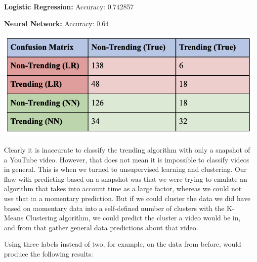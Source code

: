 \documentclass{article}
\begin{document}
\textbf{Logistic Regression:} Accuracy: 0.742857 
\par \textbf{Neural Network:} Accuracy: 0.64 
\begin{center}
\includegraphics[scale=.7]{momentary_at.png}\\
\end{center}
\quad Clearly it is inaccurate to classify the trending algorithm with only a snapshot of a YouTube video. However, that does not mean it is impossible to classify videos in general. This is when we turned to unsupervised learning and clustering. Our flaw with predicting based on a snapshot was that we were trying to emulate an algorithm that takes into account time as a large factor, whereas we could not use that in a momentary prediction. But if we could cluster the data we did have based on momentary data into a self-defined number of clusters with the K-Means Clustering algorithm, we could predict the cluster a video would be in, and from that gather general data predictions about that video.
\par Using three labels instead of two, for example, on the data from before, would produce the following results: \\
\end{document}
